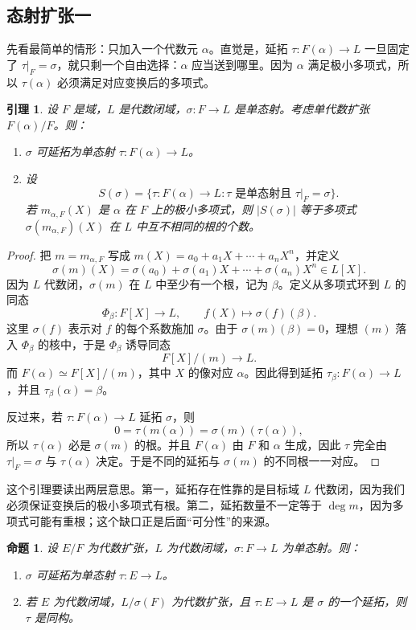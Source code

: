 \documentclass[11pt,a4paper,openany]{ctexbook}
\numberwithin{equation}{chapter}
\theoremstyle{plain}
\newtheorem{proposition}[theorem]{命题}
\newtheorem{lemma}[theorem]{引理}
\theoremstyle{definition}
\theoremstyle{remark}
\begin{document}
\subsection{态射扩张一}

先看最简单的情形：只加入一个代数元 $\alpha$。直觉是，延拓 $\tau:F(\alpha)\to L$ 一旦固定了 $\tau|_F=\sigma$，就只剩一个自由选择：$\alpha$ 应当送到哪里。因为 $\alpha$ 满足极小多项式，所以 $\tau(\alpha)$ 必须满足对应变换后的多项式。

\begin{lemma}
设 $F$ 是域，$L$ 是代数闭域，$\sigma:F\to L$ 是单态射。考虑单代数扩张 $F(\alpha)/F$。则：
\begin{enumerate}[label=(\arabic*)]
\item $\sigma$ 可延拓为单态射 $\tau:F(\alpha)\to L$。
\item 设
\[
S(\sigma)=\{\tau:F(\alpha)\to L:\tau\text{ 是单态射且 }\tau|_F=\sigma\}.
\]
若 $m_{\alpha,F}(X)$ 是 $\alpha$ 在 $F$ 上的极小多项式，则 $|S(\sigma)|$ 等于多项式 $\sigma(m_{\alpha,F})(X)$ 在 $L$ 中互不相同的根的个数。
\end{enumerate}
\end{lemma}

\begin{proof}
把 $m=m_{\alpha,F}$ 写成 $m(X)=a_0+a_1X+\cdots+a_nX^n$，并定义
\[
\sigma(m)(X)=\sigma(a_0)+\sigma(a_1)X+\cdots+\sigma(a_n)X^n\in L[X].
\]
因为 $L$ 代数闭，$\sigma(m)$ 在 $L$ 中至少有一个根，记为 $\beta$。定义从多项式环到 $L$ 的同态
\[
\Phi_\beta:F[X]\longrightarrow L,\qquad f(X)\longmapsto \sigma(f)(\beta).
\]
这里 $\sigma(f)$ 表示对 $f$ 的每个系数施加 $\sigma$。由于 $\sigma(m)(\beta)=0$，理想 $(m)$ 落入 $\Phi_\beta$ 的核中，于是 $\Phi_\beta$ 诱导同态
\[
F[X]/(m)\longrightarrow L.
\]
而 $F(\alpha)\simeq F[X]/(m)$，其中 $X$ 的像对应 $\alpha$。因此得到延拓 $\tau_\beta:F(\alpha)\to L$，并且 $\tau_\beta(\alpha)=\beta$。

反过来，若 $\tau:F(\alpha)\to L$ 延拓 $\sigma$，则
\[
0=\tau(m(\alpha))=\sigma(m)(\tau(\alpha)),
\]
所以 $\tau(\alpha)$ 必是 $\sigma(m)$ 的根。并且 $F(\alpha)$ 由 $F$ 和 $\alpha$ 生成，因此 $\tau$ 完全由 $\tau|_F=\sigma$ 与 $\tau(\alpha)$ 决定。于是不同的延拓与 $\sigma(m)$ 的不同根一一对应。
\end{proof}

这个引理要读出两层意思。第一，延拓存在性靠的是目标域 $L$ 代数闭，因为我们必须保证变换后的极小多项式有根。第二，延拓数量不一定等于 $\deg m$，因为多项式可能有重根；这个缺口正是后面“可分性”的来源。

\begin{proposition}
设 $E/F$ 为代数扩张，$L$ 为代数闭域，$\sigma:F\to L$ 为单态射。则：
\begin{enumerate}[label=(\arabic*)]
\item $\sigma$ 可延拓为单态射 $\tau:E\to L$。
\item 若 $E$ 为代数闭域，$L/\sigma(F)$ 为代数扩张，且 $\tau:E\to L$ 是 $\sigma$ 的一个延拓，则 $\tau$ 是同构。
\end{enumerate}
\end{proposition}
\end{document}
